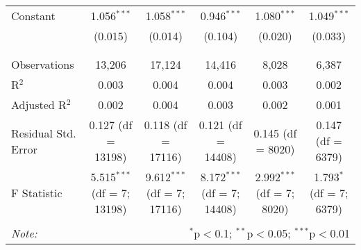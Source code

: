 \begin{table}[!htbp]
\begin{tabular}{@{\extracolsep{5pt}}lccccc}
 Constant & 1.056$^{***}$ & 1.058$^{***}$ & 0.946$^{***}$ & 1.080$^{***}$ & 1.049$^{***}$ \\ 
  & (0.015) & (0.014) & (0.104) & (0.020) & (0.033) \\ 
  & & & & & \\ 
\hline \\[-1.8ex] 
Observations & 13,206 & 17,124 & 14,416 & 8,028 & 6,387 \\ 
R$^{2}$ & 0.003 & 0.004 & 0.004 & 0.003 & 0.002 \\ 
Adjusted R$^{2}$ & 0.002 & 0.004 & 0.003 & 0.002 & 0.001 \\ 
Residual Std. Error & 0.127 (df = 13198) & 0.118 (df = 17116) & 0.121 (df = 14408) & 0.145 (df = 8020) & 0.147 (df = 6379) \\ 
F Statistic & 5.515$^{***}$ (df = 7; 13198) & 9.612$^{***}$ (df = 7; 17116) & 8.172$^{***}$ (df = 7; 14408) & 2.992$^{***}$ (df = 7; 8020) & 1.793$^{*}$ (df = 7; 6379) \\ 
\hline 
\hline \\[-1.8ex] 
\textit{Note:}  & \multicolumn{5}{r}{$^{*}$p$<$0.1; $^{**}$p$<$0.05; $^{***}$p$<$0.01} \\ 
\end{tabular} 
\end{table} 
